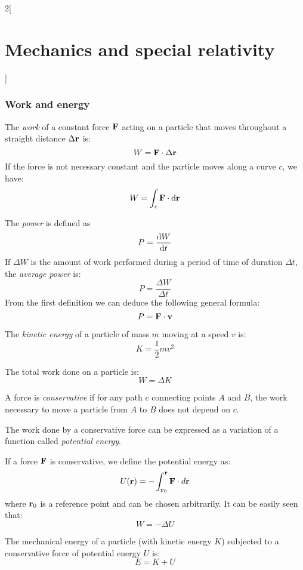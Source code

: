 \documentclass[../../../main_physics.tex]{subfiles}
\begin{document}
\begin{multicols}{2}[\section{Mechanics and special relativity}]
  \subsubsection{Work and energy}
  \begin{definition}[Work]
    The \emph{work} of a constant force $\boldsymbol{\mathrm{F}}$ acting on a particle that moves throughout a straight distance $\Delta\boldsymbol{\mathrm{r}}$ is: $$ W=\boldsymbol{\mathrm{F}}\cdot\Delta\boldsymbol{\mathrm{r}}$$ If the force is not necessary constant and the particle moves along a curve $c$, we have: $$W=\int_c\boldsymbol{\mathrm{F}}\cdot \dd{\boldsymbol{\mathrm{r}}}$$
  \end{definition}
  \begin{definition}[Power]
    The \emph{power} is defined as $$P=\dv{W}{t}$$ If $\Delta W$ is the amount of work performed during a period of time of duration $\Delta t$, the \emph{average power} is: $$P=\frac{\Delta W}{\Delta t}$$ From the first definition we can deduce the following general formula: $$P=\boldsymbol{\mathrm{F}}\cdot\boldsymbol{\mathrm{v}}$$
  \end{definition}
  \begin{definition}
    The \emph{kinetic energy} of a particle of mass $m$ moving at a speed $v$ is: $$K=\frac{1}{2}mv^2$$
  \end{definition}
  \begin{theorem}
    The total work done on a particle is:
    $$W=\Delta K$$
  \end{theorem}
  \begin{definition}
    A force is \emph{conservative} if for any path $c$ connecting points $A$ and $B$, the work necessary to move a particle from $A$ to $B$ does not depend on $c$.
  \end{definition}
  \begin{proposition}
    The work done by a conservative force can be expressed as a variation of a function called \emph{potential energy}.
  \end{proposition}
  \begin{proposition}
    If a force $\boldsymbol{\mathrm{F}}$ is conservative, we define the potential energy as: $$U(\boldsymbol{\mathrm{r}})=-\int_{\boldsymbol{\mathrm{r}}_0}^{\boldsymbol{\mathrm{r}}}\boldsymbol{\mathrm{F}}\cdot d\boldsymbol{\mathrm{r}}$$ where $\boldsymbol{\mathrm{r}}_0$ is a reference point and can be chosen arbitrarily. It can be easily seen that: $$W=-\Delta U$$
  \end{proposition}
  \begin{proposition}
    The mechanical energy of a particle (with kinetic energy $K$) subjected to a conservative force of potential energy $U$ is: $$E=K+U$$

\end{proposition}
\end{multicols}
\end{document}
